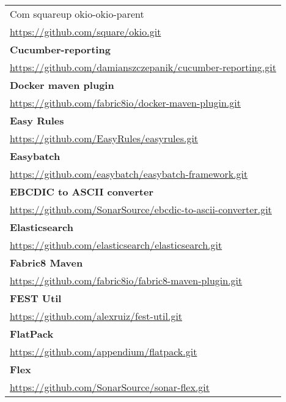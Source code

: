\begin{table}[]
\begin{tabular}{|p{130mm}|}
Com squareup okio-okio-parent                      \\ \url{https://github.com/square/okio.git}                                           \\ \hline \bf
Cucumber-reporting                                 \\ \url{https://github.com/damianszczepanik/cucumber-reporting.git}                   \\ \hline \bf
Docker maven plugin                                \\ \url{https://github.com/fabric8io/docker-maven-plugin.git}                         \\ \hline \bf
Easy Rules                                         \\ \url{https://github.com/EasyRules/easyrules.git}                                   \\ \hline \bf
Easybatch                                          \\ \url{https://github.com/easybatch/easybatch-framework.git}                         \\ \hline \bf
EBCDIC to ASCII converter                          \\ \url{https://github.com/SonarSource/ebcdic-to-ascii-converter.git}                 \\ \hline \bf
Elasticsearch                                      \\ \url{https://github.com/elasticsearch/elasticsearch.git}                           \\ \hline \bf
Fabric8 Maven                           \\ \url{https://github.com/fabric8io/fabric8-maven-plugin.git}                        \\ \hline \bf
FEST Util                                          \\ \url{https://github.com/alexruiz/fest-util.git}                                    \\ \hline \bf
FlatPack                                           \\ \url{https://github.com/appendium/flatpack.git}                                    \\ \hline \bf
Flex                                               \\ \url{https://github.com/SonarSource/sonar-flex.git}                                \\ \hline
\end{tabular}
\end{table}

